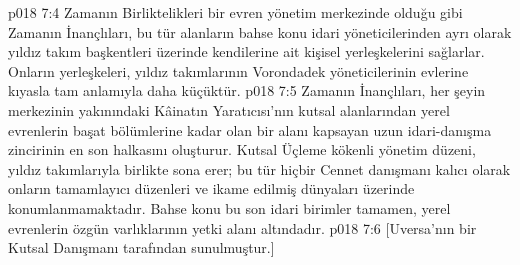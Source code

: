 \vs p018 7:4 Zamanın Birliktelikleri bir evren yönetim merkezinde olduğu gibi Zamanın İnançlıları, bu tür alanların bahse konu idari yöneticilerinden ayrı olarak yıldız takım başkentleri üzerinde kendilerine ait kişisel yerleşkelerini sağlarlar. Onların yerleşkeleri, yıldız takımlarının Vorondadek yöneticilerinin evlerine kıyasla tam anlamıyla daha küçüktür.
\vs p018 7:5 Zamanın İnançlıları, her şeyin merkezinin yakınındaki Kâinatın Yaratıcısı’nın kutsal alanlarından yerel evrenlerin başat bölümlerine kadar olan bir alanı kapsayan uzun idari\hyp{}danışma zincirinin en son halkasını oluşturur. Kutsal Üçleme kökenli yönetim düzeni, yıldız takımlarıyla birlikte sona erer; bu tür hiçbir Cennet danışmanı kalıcı olarak onların tamamlayıcı düzenleri ve ikame edilmiş dünyaları üzerinde konumlanmamaktadır. Bahse konu bu son idari birimler tamamen, yerel evrenlerin özgün varlıklarının yetki alanı altındadır.
\vs p018 7:6 [Uversa’nın bir Kutsal Danışmanı tarafından sunulmuştur.]
